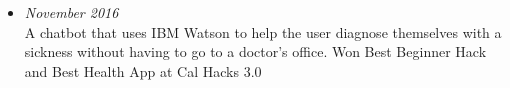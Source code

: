 \documentclass[letterpaper,8pt]{article}
\begin{document}
{\begin{itemize}[noitemsep]
\item{\small{\textbf{\href{https://devpost.com/software/bearmax}{}}}\hfill{\textit{November 2016}} \\
	\small{A chatbot that uses IBM Watson to help the user diagnose themselves with a sickness without having to go to a doctor's office. Won Best Beginner Hack and Best Health App at Cal Hacks 3.0}}





\end{itemize}



\vspace{0.02in}

}
\end{document}
